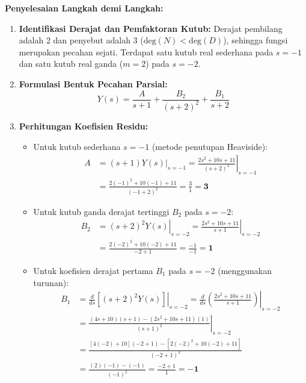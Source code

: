 \documentclass[11pt,a4paper]{article}
\theoremstyle{definition}
\begin{document}
\noindent\textbf{Penyelesaian Langkah demi Langkah:}
\begin{enumerate}[leftmargin=*]
    \item \textbf{Identifikasi Derajat dan Pemfaktoran Kutub:}
    Derajat pembilang adalah 2 dan penyebut adalah 3 ($\text{deg}(N) < \text{deg}(D)$), sehingga fungsi merupakan pecahan sejati. Terdapat satu kutub real sederhana pada $s = -1$ dan satu kutub real ganda ($m=2$) pada $s = -2$.
    
    \item \textbf{Formulasi Bentuk Pecahan Parsial:}
    \begin{equation*}
        Y(s) = \frac{A}{s + 1} + \frac{B_2}{(s + 2)^2} + \frac{B_1}{s + 2}
    \end{equation*}
    
    \item \textbf{Perhitungan Koefisien Residu:}
    \begin{itemize}[leftmargin=*]
        \item Untuk kutub sederhana $s = -1$ (metode penutupan Heaviside):
        \begin{align*}
            A &= \left. (s + 1) Y(s) \right|_{s = -1} = \left. \frac{2s^2 + 10s + 11}{(s + 2)^2} \right|_{s = -1} \\
              &= \frac{2(-1)^2 + 10(-1) + 11}{(-1 + 2)^2} = \frac{3}{1} = \mathbf{3}
        \end{align*}
        \item Untuk kutub ganda derajat tertinggi $B_2$ pada $s = -2$:
        \begin{align*}
            B_2 &= \left. (s + 2)^2 Y(s) \right|_{s = -2} = \left. \frac{2s^2 + 10s + 11}{s + 1} \right|_{s = -2} \\
                &= \frac{2(-2)^2 + 10(-2) + 11}{-2 + 1} = \frac{-1}{-1} = \mathbf{1}
        \end{align*}
        \item Untuk koefisien derajat pertama $B_1$ pada $s = -2$ (menggunakan turunan):
        \begin{align*}
            B_1 &= \left. \frac{d}{ds} \left[ (s + 2)^2 Y(s) \right] \right|_{s = -2} = \left. \frac{d}{ds} \left( \frac{2s^2 + 10s + 11}{s + 1} \right) \right|_{s = -2} \\
            &= \left. \frac{(4s + 10)(s + 1) - (2s^2 + 10s + 11)(1)}{(s + 1)^2} \right|_{s = -2} \\
            &= \frac{[4(-2) + 10](-2 + 1) - [2(-2)^2 + 10(-2) + 11]}{(-2 + 1)^2} \\
            &= \frac{(2)(-1) - (-1)}{(-1)^2} = \frac{-2 + 1}{1} = \mathbf{-1}
        \end{align*}
    \end{itemize}
    

\end{enumerate}
\end{document}

